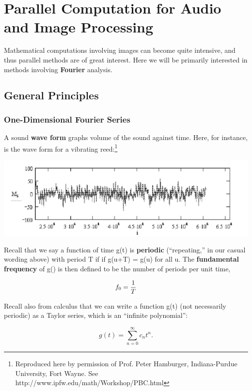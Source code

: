 \chapter{Parallel Computation for Audio and Image Processing}
\label{chap:fft}

Mathematical computations involving images can become quite intensive,
and thus parallel methods are of great interest.  Here we will be
primarily interested in methods involving {\bf Fourier} analysis.  

\section{General Principles}

\subsection{One-Dimensional Fourier Series}

A sound {\bf wave form} graphs volume of the sound against time.  Here,
for instance, is the wave form for a vibrating reed:\footnote{Reproduced
here by permission of Prof. Peter Hamburger, Indiana-Purdue University,
Fort Wayne. See http://www.ipfw.edu/math/Workshop/PBC.html }

\includegraphics{Images/ReedTime.jpg}  

Recall that we say a function of time g(t) is \textbf{periodic}
(``repeating,'' in our casual wording above) with period T if if g(u+T)
= g(u) for all u. The \textbf{fundamental frequency} of g() is then
defined to be the number of periods per unit time,

\begin{equation}
f_{0}={1\over T}
\end{equation}

Recall also from calculus that we can write a function g(t) (not
necessarily periodic) as a Taylor series, which is an ``infinite
polynomial'':

\begin{equation}
\label{poly}
g(t)=\sum _{n=0}^{\infty }c_{n}t^{n}.
\end{equation}

